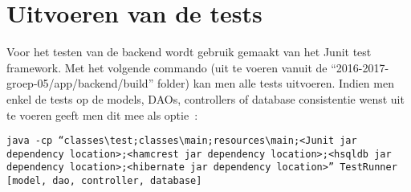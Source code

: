 \documentclass{article}
\begin{document}
\section{Uitvoeren van de tests}
Voor het testen van de backend wordt gebruik gemaakt van het Junit test framework. Met het volgende commando (uit te voeren vanuit de "`2016-2017-groep-05/app/backend/build"' folder) kan men alle tests uitvoeren. Indien men enkel de tests op de models, DAOs, controllers of database consistentie wenst uit te voeren geeft men dit mee als optie~:\\
\begin{center}
	\texttt{java -cp "`classes\textbackslash test;classes\textbackslash main;resources\textbackslash main;<Junit jar dependency location>;<hamcrest jar dependency location>;<hsqldb jar dependency location>;<hibernate jar dependency location>"' TestRunner [model, dao, controller, database]}
\end{center}
\end{document}
